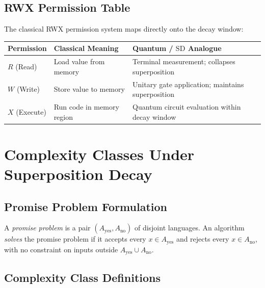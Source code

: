 \documentclass[11pt]{article}
\theoremstyle{plain}
\theoremstyle{definition}
\theoremstyle{remark}
\newcommand{\SD}{\ensuremath{\mathrm{SD}}}   %
\begin{document}
\subsection{RWX Permission Table}

The classical RWX permission system maps directly onto the decay window:

\begin{center}
\begin{tabular}{@{}lll@{}}
  \toprule
  \textbf{Permission} & \textbf{Classical Meaning} & \textbf{Quantum / \SD{} Analogue} \\
  \midrule
  $R$ (Read)    & Load value from memory         & Terminal measurement; collapses superposition \\
  $W$ (Write)   & Store value to memory          & Unitary gate application; maintains superposition \\
  $X$ (Execute) & Run code in memory region      & Quantum circuit evaluation within decay window \\
  \bottomrule
\end{tabular}
\end{center}

\section{Complexity Classes Under Superposition Decay}
\label{sec:complexity}

\subsection{Promise Problem Formulation}

A \emph{promise problem} is a pair $(A_{\text{yes}}, A_{\text{no}})$ of
disjoint languages.  An algorithm \emph{solves} the promise problem if it
accepts every $x \in A_{\text{yes}}$ and rejects every $x \in A_{\text{no}}$,
with no constraint on inputs outside $A_{\text{yes}} \cup A_{\text{no}}$.

\subsection{Complexity Class Definitions}
\end{document}
